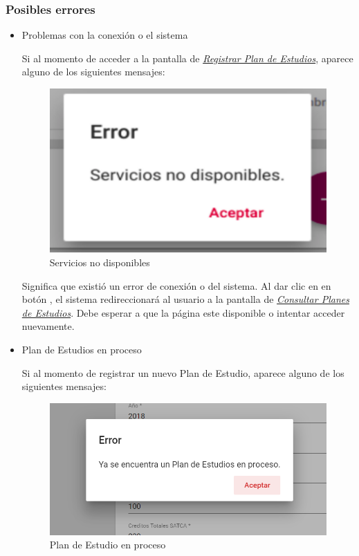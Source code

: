 \subsubsection{Posibles errores}
\begin{itemize}

	\item Problemas con la conexión o el sistema

	Si al momento de acceder a la pantalla de \hyperlink{registrarPE}{\textit{Registrar Plan de Estudios}}, aparece alguno de los siguientes mensajes:
		\begin{figure}[!hbtp]
		\centering
		\hypertarget{error}{\includegraphics[width=0.7\linewidth]{images/SP4-GPE/error}}
		\caption{Servicios no disponibles}
		\label{error}
		\end{figure}


	Significa que existió un error de conexión o del sistema. Al dar clic en en botón , el sistema redireccionará al usuario a la pantalla de \hyperlink{consultarPE}{\textit{Consultar Planes de Estudios}}. Debe esperar a que la página este disponible o intentar acceder nuevamente.
	\newpage
	\item Plan de Estudios en proceso

	Si al momento de registrar un nuevo Plan de Estudio, aparece alguno de los siguientes mensajes:
	\begin{figure}[!hbtp]
		\centering
		\hypertarget{error1}{\includegraphics[width=0.7\linewidth]{images/SP4-GPE/error1}}
		\caption{Plan de Estudio en proceso}
		\label{error1}
	\end{figure}



\end{itemize}

